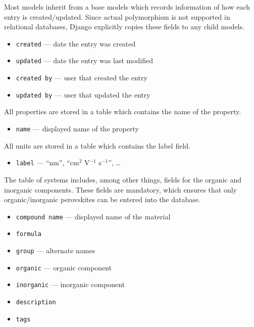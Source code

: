 \documentclass{article}
\begin{document}
Most models inherit from a base models which records information of how each entry is created/updated. Since actual polymorphism is not supported in relational databases, Django explicitly copies these fields to any child models.
\begin{tcolorbox}[colback=green!5,colframe=green!40!black,title=Base]
  \begin{itemize}
  \item \texttt{created} --- date the entry was created
  \item \texttt{updated} --- date the entry was last modified
  \item \texttt{created by} --- user that created the entry
  \item \texttt{updated by} --- user that updated the entry
  \end{itemize}
\end{tcolorbox}

All properties are stored in a table which contains the name of the property. \begin{tcolorbox}[colback=green!5,colframe=green!40!black,title=Property(Base)]
  \begin{itemize}
  \item \texttt{name} --- displayed name of the property
  \end{itemize}
\end{tcolorbox}

All units are stored in a table which contains the label field.
\begin{tcolorbox}[colback=green!5,colframe=green!40!black,title=Unit(Base)]
  \begin{itemize}
  \item \texttt{label} --- ``nm'', ``cm$^2$ V$^{-1}$ s$^{-1}$'', \ldots
  \end{itemize}
\end{tcolorbox}

The table of systems includes, among other things, fields for the organic and inorganic components. These fields are mandatory, which ensures that only organic/inorganic perovskites can be entered into the database.
\begin{tcolorbox}[colback=green!5,colframe=green!40!black,title=System(Base)]
  \begin{itemize}
  \item \texttt{compound name} --- displayed name of the material
  \item \texttt{formula}
  \item \texttt{group} --- alternate names
  \item \texttt{organic} --- organic component
  \item \texttt{inorganic} --- inorganic component
  \item \texttt{description}
  \item \texttt{tags}
  \end{itemize}
\end{tcolorbox}
\end{document}
